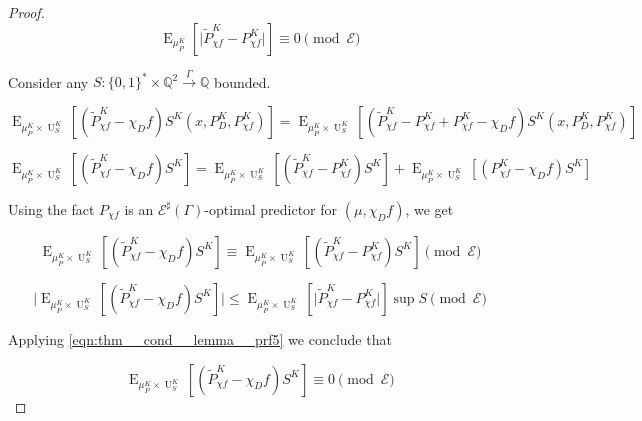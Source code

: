 \documentclass{article}
\numberwithin{equation}{section}
\theoremstyle{definition}
\theoremstyle{plain}
\newcommand{\Bool}{\{0,1\}}
\newcommand{\Words}{{\Bool^*}}
\DeclareMathOperator{\E}{E}
\DeclareMathOperator{\Un}{U}
\newcommand{\Rats}{\mathbb{Q}}
\newcommand{\Abs}[1]{\lvert #1 \rvert}
\newcommand{\Fall}{\mathcal{E}}
\newcommand{\ESG}{\Fall^\sharp(\Gamma)}
\newcommand{\Scheme}{\xrightarrow{\Gamma}}
\begin{document}
\begin{proof}
\begin{equation}
\label{eqn:thm__cond__lemma__prf5}
\E_{\mu_P^K}[\Abs{\tilde{P}_{\chi f}^K - P_{\chi f}^K}] \equiv 0 \pmod \Fall
\end{equation}

Consider any $S: \Words \times \Rats^2 \Scheme \Rats$ bounded.

\[\E_{\mu_P^K \times \Un_S^K}[(\tilde{P}_{\chi f}^K - \chi_Df) S^K(x,P_D^K,P_{\chi f}^K)]=\E_{\mu_P^K \times \Un_S^K}[(\tilde{P}_{\chi f}^K - P_{\chi f}^K + P_{\chi f}^K - \chi_Df) S^K(x,P_D^K,P_{\chi f}^K)]\]

\[\E_{\mu_P^K \times \Un_S^K}[(\tilde{P}_{\chi f}^K - \chi_D f) S^K]=\E_{\mu_P^K \times \Un_S^K}[(\tilde{P}_{\chi f}^K - P_{\chi f}^K) S^K]+\E_{\mu_P^K \times \Un_S^K}[( P_{\chi f}^K - \chi_Df) S^K]\]

Using the fact $P_{\chi f}$ is an $\ESG$-optimal predictor for $(\mu, \chi_D f)$, we get

\[\E_{\mu_P^K \times \Un_S^K}[(\tilde{P}_{\chi f}^K - \chi_D f) S^K] \equiv \E_{\mu_P^K \times \Un_S^K}[(\tilde{P}_{\chi f}^K - P_{\chi f}^K) S^K] \pmod \Fall\]

\[\Abs{\E_{\mu_P^K \times \Un_S^K}[(\tilde{P}_{\chi f}^K - \chi_D f) S^K]} \leq \E_{\mu_P^K \times \Un_S^K}[\Abs{\tilde{P}_{\chi f}^K - P_{\chi f}^K}] \sup S \pmod \Fall\]

Applying \ref{eqn:thm__cond__lemma__prf5} we conclude that

\[\E_{\mu_P^K \times \Un_S^K}[(\tilde{P}_{\chi f}^K - \chi_D f) S^K] \equiv 0 \pmod \Fall\]
%
\end{proof}
\end{document}
